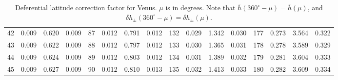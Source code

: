 \begin{table}[!h]
{\begin{tabular}{rrrr|rrrr|rrrr|crrr}
 42 & \tiny{  0.009} &   0.620 & \tiny{  0.009} &  87 & \tiny{  0.012} &   0.791 & \tiny{  0.012} & 132 & \tiny{  0.029} &   1.342 & \tiny{  0.030} & 177 & \tiny{  0.273} &   3.564 & \tiny{  0.322}\\
 43 & \tiny{  0.009} &   0.622 & \tiny{  0.009} &  88 & \tiny{  0.012} &   0.797 & \tiny{  0.012} & 133 & \tiny{  0.030} &   1.365 & \tiny{  0.031} & 178 & \tiny{  0.278} &   3.589 & \tiny{  0.329}\\
 44 & \tiny{  0.009} &   0.624 & \tiny{  0.009} &  89 & \tiny{  0.012} &   0.803 & \tiny{  0.012} & 134 & \tiny{  0.031} &   1.389 & \tiny{  0.032} & 179 & \tiny{  0.281} &   3.604 & \tiny{  0.333}\\
 45 & \tiny{  0.009} &   0.627 & \tiny{  0.009} &  90 & \tiny{  0.012} &   0.810 & \tiny{  0.013} & 135 & \tiny{  0.032} &   1.413 & \tiny{  0.033} & 180 & \tiny{  0.282} &   3.609 & \tiny{  0.334}\\
\end{tabular}}
\caption{Deferential latitude correction factor for Venus. $\mu$ is in degrees. Note that $\bar{h}(360^\circ-\mu) = \bar{h}(\mu)$, and $\delta h_{\pm}(360^\circ-\mu) = \delta h_{\pm}(\mu)$. }\label{tlat2v}
\end{table}

